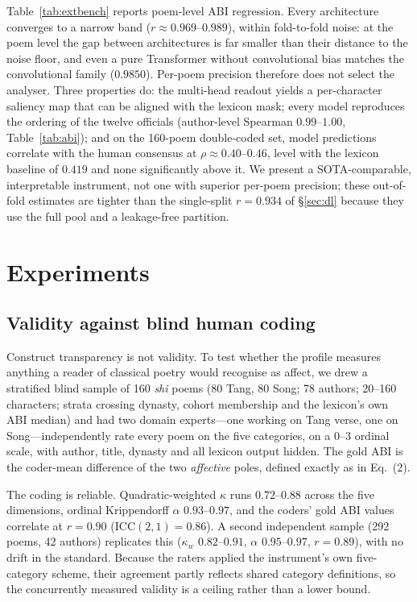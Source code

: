 \documentclass[10pt]{article}
\begin{document}
Table~\ref{tab:extbench} reports poem-level ABI regression. Every architecture
converges to a narrow band ($r\approx0.969$--$0.989$), within fold-to-fold noise: at
the poem level the gap between architectures is far smaller than their distance to
the noise floor, and even a pure Transformer without convolutional bias matches the
convolutional family ($0.9850$). Per-poem precision therefore does not select the
analyser. Three properties do: the multi-head readout yields a per-character saliency
map that can be aligned with the lexicon mask; every model reproduces the ordering of
the twelve officials (author-level Spearman $0.99$--$1.00$, Table~\ref{tab:abi}); and
on the 160-poem double-coded set, model predictions correlate with the human
consensus at $\rho\approx0.40$--$0.46$, level with the lexicon baseline of $0.419$ and
none significantly above it. We present a SOTA-comparable, interpretable instrument,
not one with superior per-poem precision; these out-of-fold estimates are tighter
than the single-split $r{=}0.934$ of \S\ref{sec:dl} because they use the full pool and
a leakage-free partition.

\section{Experiments}
\label{sec:profiles}

\subsection{Validity against blind human coding}
\label{sec:gold}

Construct transparency is not validity. To test whether the profile measures anything
a reader of classical poetry would recognise as affect, we drew a stratified blind
sample of 160 \emph{shi} poems (80 Tang, 80 Song; 78 authors; 20--160 characters;
strata crossing dynasty, cohort membership and the lexicon's own ABI median) and had
two domain experts---one working on Tang verse, one on Song---independently rate every
poem on the five categories, on a 0--3 ordinal scale, with author, title, dynasty and
all lexicon output hidden. The gold ABI is the coder-mean difference of the two
\emph{affective} poles, defined exactly as in Eq.~(2).

The coding is reliable. Quadratic-weighted $\kappa$ runs $0.72$--$0.88$ across the
five dimensions, ordinal Krippendorff $\alpha$ $0.93$--$0.97$, and the coders' gold
ABI values correlate at $r{=}0.90$ (ICC$(2,1){=}0.86$). A second independent sample
(292 poems, 42 authors) replicates this ($\kappa_w$ $0.82$--$0.91$, $\alpha$
$0.95$--$0.97$, $r{=}0.89$), with no drift in the standard. Because the raters applied
the instrument's own five-category scheme, their agreement partly reflects shared
category definitions, so the concurrently measured validity is a ceiling rather than
a lower bound.
\end{document}
